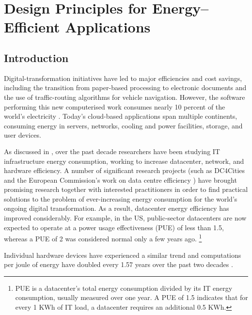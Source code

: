 \chapter{Design Principles for Energy--Efficient Applications}


\section{Introduction}

Digital-transformation initiatives have led to major efficiencies and cost savings, including the transition from paper-based processing to electronic documents and the use of traffic-routing algorithms for vehicle navigation. However, the software performing this new computerised work consumes nearly 10 percent of the world's electricity \cite{mills2013-digital-energyusage}. Today's cloud-based applications span multiple continents, consuming energy in servers, networks, cooling and power facilities, storage, and user devices.

As discussed in , over the past decade researchers have been studying IT infrastructure energy consumption, working to increase datacenter, network, and hardware efficiency. A number of significant research projects (such as DC4Cities \cite{dc4cities2014_dcmetrics} and the European Commission's work on data centre efficiency \cite{eu2018-datacentreenergy}) have brought promising research together with interested practitioners in order to find practical solutions to the problem of ever-increasing energy consumption for the world's ongoing digital transformation.  As a result, datacenter energy efficiency has improved considerably. For example, in the US, public-sector datacenters are now expected to operate at a power usage effectiveness (PUE) of less than 1.5, whereas a PUE of 2 was considered normal only a few years ago. \footnote{PUE is a datacenter's total energy consumption divided by its IT energy consumption, usually measured over one year. A PUE of 1.5 indicates that for every 1 KWh of IT load, a datacenter requires an additional 0.5 KWh.}

Individual hardware devices have experienced a similar trend and computations per joule of energy have doubled every 1.57 years over the past two decades \cite{koomey2011-trends-energy-efficiency}. 

